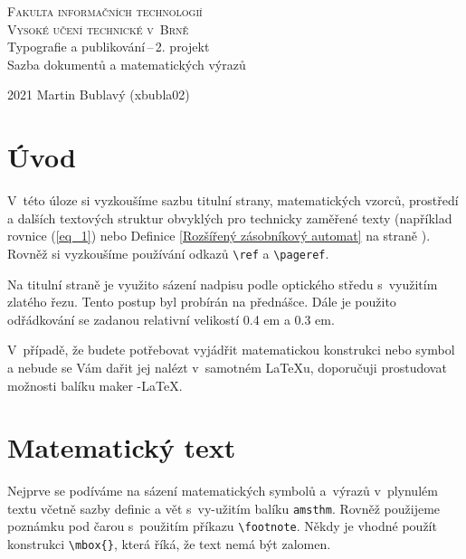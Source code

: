 \documentclass[a4paper, 11pt, twocolumn]{article}
\theoremstyle{definition}
\theoremstyle{plain}
\begin{document}
    \begin{titlepage}
        \begin{center}
            \Huge
            \textsc{Fakulta informačních technologií\\ Vysoké učení technické v~Brně}\\
            \LARGE
                Typografie a publikování\,--\,2. projekt\\ Sazba dokumentů a matematických výrazů\\
        \end{center}
        {\Large 2021 \hfill Martin Bublavý (xbubla02)}
    \end{titlepage}
	
    \section*{Úvod}
        V~této úloze si vyzkoušíme sazbu titulní strany, matematic\-kých vzorců, prostředí a dalších textových struktur obvyklých pro technicky zaměřené texty (například rovnice (\ref{eq_1}) nebo Definice \ref{Rozšířený zásobníkový automat} na straně \pageref{Rozšířený zásobníkový automat}). Rovněž si vyzkoušíme používání odkazů \verb+\ref+ a \verb+\pageref+.
        
        Na titulní straně je využito sázení nadpisu podle optického středu s~využitím zlatého řezu. Tento postup byl probírán na přednášce. Dále je použito odřádkování se zadanou relativní velikostí 0.4 em a 0.3 em.
        
        V~případě, že budete potřebovat vyjádřit matematickou konstrukci nebo symbol a nebude se Vám dařit jej nalézt v~samotném \LaTeX u, doporučuji prostudovat možnosti balíku maker \AmS -\LaTeX.
    
    \section{Matematický text}
        Nejprve se podíváme na sázení matematických symbolů a~výrazů v~plynulém textu včetně sazby definic a vět s~vy-užitím balíku \verb+amsthm+. Rovněž použijeme poznámku pod čarou s~použitím příkazu \verb+\footnote+. Někdy je vhodné použít konstrukci \verb+\mbox{}+, která říká, že text nemá být zalomen.
\end{document}
